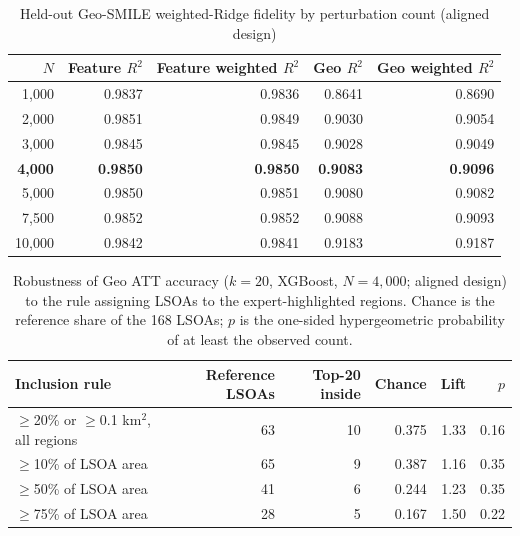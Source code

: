 \begin{table}[H]
\centering
\caption{Held-out Geo-SMILE weighted-Ridge fidelity by perturbation count (aligned design)}
\label{tab:hull_fidelity_by_n_aligned}
\small
\begin{tabular}{rrrrr}
\toprule
$N$ & Feature $R^2$ & Feature weighted $R^2$ & Geo $R^2$ & Geo weighted $R^2$ \\
\midrule
1,000 & 0.9837 & 0.9836 & 0.8641 & 0.8690 \\
2,000 & 0.9851 & 0.9849 & 0.9030 & 0.9054 \\
3,000 & 0.9845 & 0.9845 & 0.9028 & 0.9049 \\
\textbf{4,000} & \textbf{0.9850} & \textbf{0.9850} & \textbf{0.9083} & \textbf{0.9096} \\
5,000 & 0.9850 & 0.9851 & 0.9080 & 0.9082 \\
7,500 & 0.9852 & 0.9852 & 0.9088 & 0.9093 \\
10,000 & 0.9842 & 0.9841 & 0.9183 & 0.9187 \\
\bottomrule
\end{tabular}
\end{table}

\begin{table}[H]
\centering
\caption{Robustness of Geo ATT accuracy ($k=20$, XGBoost, $N=4{,}000$; aligned design) to the rule assigning LSOAs to the expert-highlighted regions. Chance is the reference share of the 168 LSOAs; $p$ is the one-sided hypergeometric probability of at least the observed count.}
\label{tab:hull_region_rule_robustness_aligned}
\small
\begin{tabular}{lrrrrr}
\toprule
Inclusion rule & Reference LSOAs & Top-20 inside & Chance & Lift & $p$ \\
\midrule
$\ge$20\% or $\ge$0.1 km$^2$, all regions & 63 & 10 & 0.375 & 1.33 & 0.16 \\
$\ge$10\% of LSOA area & 65 & 9 & 0.387 & 1.16 & 0.35 \\
$\ge$50\% of LSOA area & 41 & 6 & 0.244 & 1.23 & 0.35 \\
$\ge$75\% of LSOA area & 28 & 5 & 0.167 & 1.50 & 0.22 \\
\bottomrule
\end{tabular}
\end{table}

